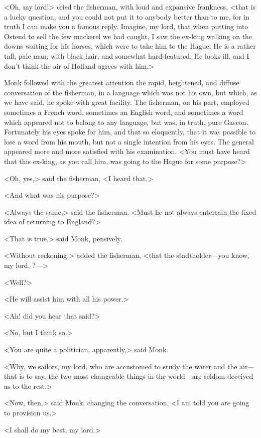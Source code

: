 <Oh, my lord!> cried the fisherman, with loud and expansive frankness, <that is a lucky question, and you could not put it to anybody better than to me, for in truth I can make you a famous reply. Imagine, my lord, that when putting into Ostend to sell the few mackerel we had caught, I saw the ex-king walking on the downs waiting for his horses, which were to take him to the Hague. He is a rather tall, pale man, with black hair, and somewhat hard-featured. He looks ill, and I don't think the air of Holland agrees with him.>

Monk followed with the greatest attention the rapid, heightened, and diffuse conversation of the fisherman, in a language which was not his own, but which, as we have said, he spoke with great facility. The fisherman, on his part, employed sometimes a French word, sometimes an English word, and sometimes a word which appeared not to belong to any language, but was, in truth, pure Gascon. Fortunately his eyes spoke for him, and that so eloquently, that it was possible to lose a word from his mouth, but not a single intention from his eyes. The general appeared more and more satisfied with his examination. <You must have heard that this ex-king, as you call him, was going to the Hague for some purpose?>

<Oh, yes,> said the fisherman, <I heard that.>

<And what was his purpose?>

<Always the same,> said the fisherman. <Must he not always entertain the fixed idea of returning to England?>

<That is true,> said Monk, pensively.

<Without reckoning,> added the fisherman, <that the stadtholder—you know, my lord, ?—>

<Well?>

<He will assist him with all his power.>

<Ah! did you hear that said?>

<No, but I think so.>

<You are quite a politician, apparently,> said Monk.

<Why, we sailors, my lord, who are accustomed to study the water and the air—that is to say, the two most changeable things in the world—are seldom deceived as to the rest.>

<Now, then,> said Monk, changing the conversation, <I am told you are going to provision us.>

<I shall do my best, my lord.>

